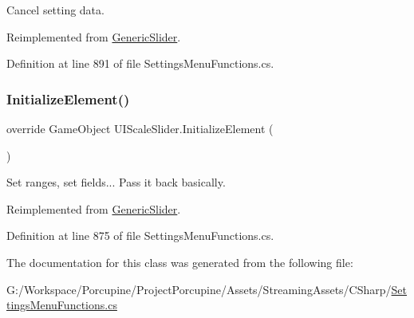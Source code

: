 Cancel setting data. 



Reimplemented from \hyperlink{class_generic_slider_ab22180d2e9abdb678b9797956224651c}{Generic\+Slider}.



Definition at line 891 of file Settings\+Menu\+Functions.\+cs.

\mbox{\label{class_u_i_scale_slider_a903948c2821f73a3f820fc22ae0064c3}} 
\subsubsection{\texorpdfstring{Initialize\+Element()}{InitializeElement()}}
{\footnotesize\ttfamily override Game\+Object U\+I\+Scale\+Slider.\+Initialize\+Element (\begin{DoxyParamCaption}{ }\end{DoxyParamCaption})\hspace{0.3cm}{\ttfamily [virtual]}}



Set ranges, set fields... Pass it back basically. 



Reimplemented from \hyperlink{class_generic_slider_afcfeee7d737e3cfc793739021a75e67c}{Generic\+Slider}.



Definition at line 875 of file Settings\+Menu\+Functions.\+cs.



The documentation for this class was generated from the following file\+:\begin{DoxyCompactItemize}
\item 
G\+:/\+Workspace/\+Porcupine/\+Project\+Porcupine/\+Assets/\+Streaming\+Assets/\+C\+Sharp/\hyperlink{_settings_menu_functions_8cs}{Settings\+Menu\+Functions.\+cs}\end{DoxyCompactItemize}
